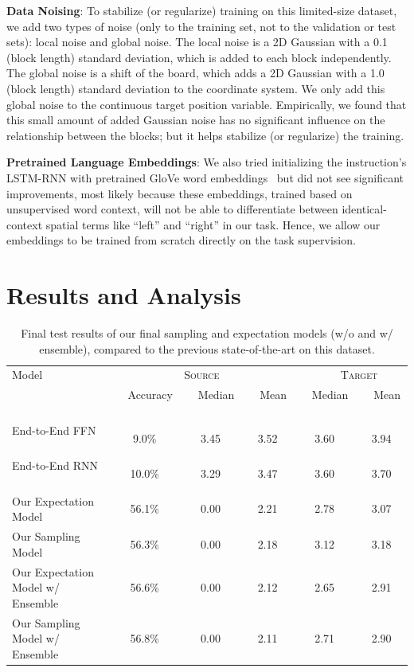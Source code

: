 \documentclass[letterpaper]{article} %
\begin{document}
\textbf{Data Noising}: To stabilize (or regularize) training on this limited-size dataset, we add two types of noise (only to the training set, not to the validation or test sets): local noise and global noise. The local noise is a 2D Gaussian with a 0.1 (block length) standard deviation, which is added to each block independently. The global noise is a shift of the board, which adds a 2D Gaussian with a 1.0 (block length) standard deviation to the coordinate system. We only add this global noise to the continuous target position variable. Empirically, we found that this small amount of added Gaussian noise has no significant influence on the relationship between the blocks;
but it helps stabilize (or regularize) the training.

\textbf{Pretrained Language Embeddings}: We also tried initializing the instruction's LSTM-RNN with pretrained GloVe word embeddings~\cite{pennington2014glove} but did not see significant improvements, most likely because these embeddings, trained based on unsupervised word context, will not be able to differentiate between identical-context spatial terms like ``left'' and ``right'' in our task. Hence, we allow our embeddings to be trained from scratch directly on the task supervision.

\section{Results and Analysis}



\begin{table}[ht!]
\begin{center}
\begin{tabular}{|l|ccc|cc|}
\hline
    \multirow{1}{*}{Model} & \multicolumn{3}{c|}{\textsc{Source}} & \multicolumn{2}{c|}{\textsc{ \ \ \ Target}} \\
  &  \ \ Accuracy \ \  & \ \  Median \ \  &  \ \ Mean  \ \  & \ \  Median \ \  &  \ \ Mean \ \  \\
\hline
\hline
End-to-End FFN ~\cite{bisk2016natural}
& 9.0\% & 3.45 & 3.52 & 3.60 & 3.94
\\
End-to-End RNN ~\cite{bisk2016natural} \ \ \ 			&	10.0\%	&	3.29	&	3.47	&	3.60	&	3.70	\\
 \hline
 \hline
Our Expectation Model \ \ \ 		&	56.1\% &	0.00	&	2.21	&	2.78	&	3.07	\\
Our Sampling Model \ \ \ 		&	56.3\% &	0.00	&	2.18 	&	3.12	&	3.18	\\
\hline
\hline
Our Expectation Model w/ Ensemble \ \ \ 		&	56.6\%	&	0.00	&	2.12	&	2.65	&	2.91	\\
Our Sampling Model w/ Ensemble\ \ \ 		&	56.8\%&	0.00	&	2.11 	&	2.71	&	2.90	\\
\hline
\end{tabular}
\end{center}
\caption{Final test results of our final sampling and expectation models (w/o and w/ ensemble), compared to the previous state-of-the-art on this dataset.}
\label{table:test_result}
\end{table}
\end{document}
